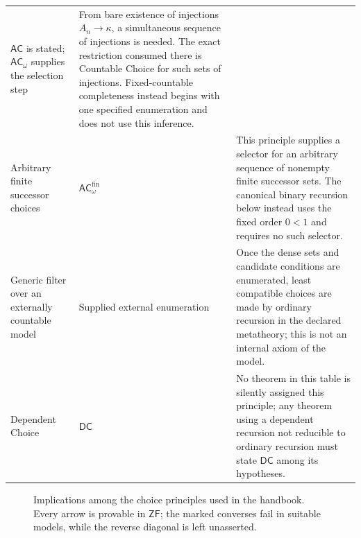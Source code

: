 \begin{longtable}{@{}p{}p{}p{}@{}}
\(\mathsf{AC}\) is stated;
\(\mathsf{AC}_{\omega}\) supplies the selection step & From bare existence
of injections \(A_n\to\kappa\), a simultaneous sequence of injections is
needed.  The exact restriction consumed there is Countable Choice for such
sets of injections.  Fixed-countable completeness instead begins with one
specified enumeration and does not use this inference. \\
Arbitrary finite successor choices &
\(\mathsf{AC}_{\omega}^{\mathrm{fin}}\) & This principle supplies a selector
for an arbitrary sequence of nonempty finite successor sets.  The canonical
binary recursion below instead uses the fixed order \(0<1\) and requires no
such selector. \\
Generic filter over an externally countable model & Supplied external
enumeration & Once the dense sets and candidate conditions are enumerated,
least compatible choices are made by ordinary recursion in the declared
metatheory; this is not an internal axiom of the model. \\
Dependent Choice & \(\mathsf{DC}\) & No theorem in this table is silently
assigned this principle; any theorem using a dependent recursion not reducible
to ordinary recursion must state \(\mathsf{DC}\) among its hypotheses. \\
\bottomrule
\end{longtable}
\endgroup

\begin{figure}[!htbp]
\centering
{}
\caption{Implications among the choice principles used in the handbook.  Every
arrow is provable in \(\mathsf{ZF}\); the marked
  converses fail in suitable models, while the reverse diagonal is left
  unasserted.}
\label{fig:p06-choice-implications}
\end{figure}
\clearpage

